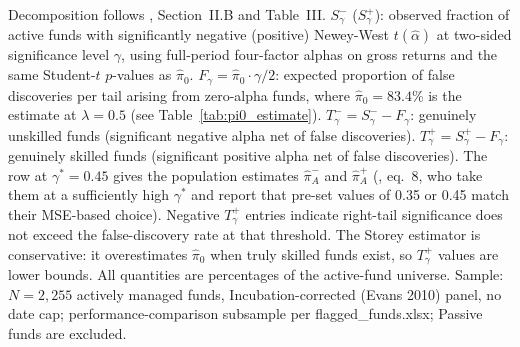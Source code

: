 \begin{table}[!htbp]
\begin{minipage}{\tabletempwidth}
\begin{singlespace}
Decomposition follows \textcite{BarrasScailletWermers2010}, Section~II.B and Table~III. $S^-_\gamma$ ($S^+_\gamma$): observed fraction of active funds with significantly negative (positive) Newey-West $t(\hat{\alpha})$ at two-sided significance level $\gamma$, using full-period \textcite{Carhart1997} four-factor alphas on gross returns and the same Student-$t$ $p$-values as $\hat{\pi}_0$. $F_\gamma = \hat{\pi}_0 \cdot \gamma/2$: expected proportion of false discoveries per tail arising from zero-alpha funds, where $\hat{\pi}_0 = 83.4\%$ is the \textcite{Storey2002} estimate at $\lambda = 0.5$ (see Table~\ref{tab:pi0_estimate}). $T^-_\gamma = S^-_\gamma - F_\gamma$: genuinely unskilled funds (significant negative alpha net of false discoveries). $T^+_\gamma = S^+_\gamma - F_\gamma$: genuinely skilled funds (significant positive alpha net of false discoveries). The row at $\gamma^* = 0.45$ gives the population estimates $\hat{\pi}^-_A$ and $\hat{\pi}^+_A$ (\citealt{BarrasScailletWermers2010}, eq.~8, who take them at a sufficiently high $\gamma^*$ and report that pre-set values of 0.35 or 0.45 match their MSE-based choice). Negative $T^+_\gamma$ entries indicate right-tail significance does not exceed the false-discovery rate at that threshold. The Storey estimator is conservative: it overestimates $\hat{\pi}_0$ when truly skilled funds exist, so $T^+_\gamma$ values are lower bounds. All quantities are percentages of the active-fund universe. Sample: $N = 2{,}255$ actively managed funds, Incubation-corrected (Evans 2010) panel, no date cap; performance-comparison subsample per flagged\_funds.xlsx; Passive funds are excluded.
\end{singlespace}
\end{minipage}
\end{table}

